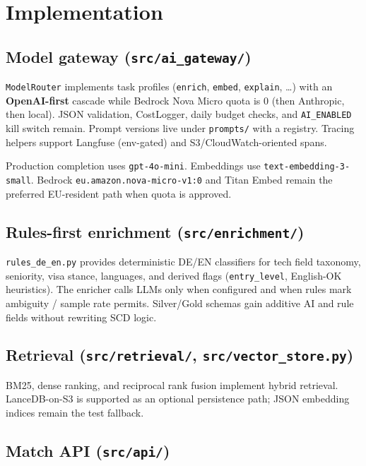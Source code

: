 \chapter{Implementation}
\label{ch:implementation}

\section{Model gateway (\texttt{src/ai\_gateway/})}

\texttt{ModelRouter} implements task profiles (\texttt{enrich}, \texttt{embed}, \texttt{explain}, \ldots) with an \textbf{OpenAI-first} cascade while Bedrock Nova Micro quota is 0 (then Anthropic, then local). JSON validation, CostLogger, daily budget checks, and \texttt{AI\_ENABLED} kill switch remain. Prompt versions live under \texttt{prompts/} with a registry. Tracing helpers support Langfuse (env-gated) and S3/CloudWatch-oriented spans.

Production completion uses \texttt{gpt-4o-mini}. Embeddings use \texttt{text-embedding-3-small}. Bedrock \texttt{eu.amazon.nova-micro-v1:0} and Titan Embed remain the preferred EU-resident path when quota is approved.

\section{Rules-first enrichment (\texttt{src/enrichment/})}

\texttt{rules\_de\_en.py} provides deterministic DE/EN classifiers for tech field taxonomy, seniority, visa stance, languages, and derived flags (\texttt{entry\_level}, English-OK heuristics). The enricher calls LLMs only when configured and when rules mark ambiguity / sample rate permits. Silver/Gold schemas gain additive AI and rule fields without rewriting SCD logic.

\section{Retrieval (\texttt{src/retrieval/}, \texttt{src/vector\_store.py})}

BM25, dense ranking, and reciprocal rank fusion implement hybrid retrieval. LanceDB-on-S3 is supported as an optional persistence path; JSON embedding indices remain the test fallback.

\section{Match API (\texttt{src/api/})}

